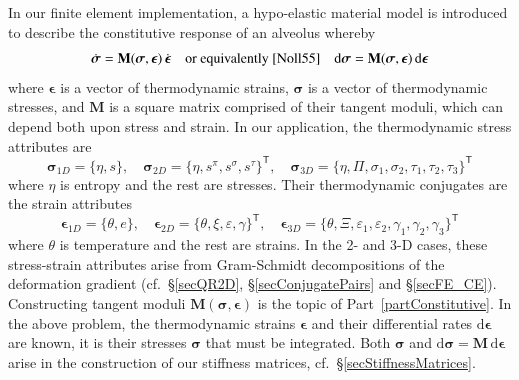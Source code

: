 In our finite element implementation, a hypo-elastic material model \cite{Truesdell55} is introduced to describe the constitutive response of an alveolus whereby
\begin{displaymath}
    \dot{\boldsymbol{\sigma}} = \mathbf{M} ( \boldsymbol{\sigma} , \boldsymbol{\epsilon} ) \, \dot{\boldsymbol{\epsilon}} 
    \quad \text{or equivalently \cite{Noll55}} \quad
    \mathrm{d} \boldsymbol{\sigma} = \mathbf{M} ( \boldsymbol{\sigma} , \boldsymbol{\epsilon} ) \, \mathrm{d} \boldsymbol{\epsilon}
\end{displaymath} 
where $\boldsymbol{\epsilon}$ is a vector of thermo\-dynamic strains, $\boldsymbol{\sigma}$ is a vector of thermo\-dynamic stresses, and $\mathbf{M}$ is a square matrix comprised of their tangent moduli, which can depend both upon stress and strain.  In our application, the thermo\-dynamic stress attributes are 
\begin{displaymath}
   \boldsymbol{\sigma}_{1D} = \{ \eta , s \} , \quad
   \boldsymbol{\sigma}_{2D} = \{ \eta , s^{\pi} , s^{\sigma} , s^{\tau} \}^{\mathsf{T}} , \quad
   \boldsymbol{\sigma}_{3D} = \{ \eta , \Pi , \sigma_1 , \sigma_2 , \tau_1 , \tau_2 , \tau_3 \}^{\mathsf{T}}
\end{displaymath}
where $\eta$ is entropy and the rest are stresses.  Their thermo\-dynamic conjugates are the strain attributes
\begin{displaymath}
\boldsymbol{\epsilon}_{1D} = \{ \theta , e \} , \quad
\boldsymbol{\epsilon}_{2D} = \{ \theta , \xi , \varepsilon , \gamma \}^{\mathsf{T}} , \quad
\boldsymbol{\epsilon}_{3D} = \{ \theta , \Xi , \varepsilon_1 , \varepsilon_2 , \gamma_1 , \gamma_2 , \gamma_3 \}^{\mathsf{T}}
\end{displaymath}
where $\theta$ is temperature and the rest are strains.  In the 2- and 3-D cases, these stress-strain attributes arise from Gram-Schmidt decompositions of the deformation gradient (cf.\ \S\ref{secQR2D}, \S\ref{secConjugatePairs} and \S\ref{secFE_CE}).  Constructing tangent moduli $\mathbf{M} ( \boldsymbol{\sigma} , \boldsymbol{\epsilon} )$ is the topic of Part~\ref{partConstitutive}.  In the above problem, the thermo\-dynamic strains $\boldsymbol{\epsilon}$ and their differential rates $\mathrm{d} \boldsymbol{\epsilon}$ are known, it is their stresses $\boldsymbol{\sigma}$ that must be integrated.  Both $\boldsymbol{\sigma}$ and $\mathrm{d} \boldsymbol{\sigma} = \mathbf{M} \, \mathrm{d} \boldsymbol{\epsilon}$ arise in the construction of our stiffness matrices, cf.\ \S\ref{secStiffnessMatrices}.

